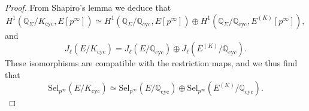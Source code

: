 \documentclass[10pt,a4paper]{amsart}
\newcommand{\Q}{\mathbb{Q}}
\newcommand{\op}[1]{\operatorname{#1}}
\begin{document}
\begin{proof}
    From Shapiro's lemma we deduce that 
    \[H^1(\Q_\Sigma/K_{\op{cyc}}, E[p^\infty])\simeq H^1(\Q_\Sigma/\Q_{\op{cyc}}, E[p^\infty])\oplus H^1(\Q_\Sigma/\Q_{\op{cyc}}, E^{(K)}[p^\infty]),\] and 
    \[J_\ell(E/K_{\op{cyc}})=J_\ell(E/\Q_{\op{cyc}})\oplus J_\ell(E^{(K)}/\Q_{\op{cyc}}).\]
    These isomorphisms are compatible with the restriction maps, and we thus find that 
    \[
    \mathrm{Sel}_{p^\infty}(E/K_{\mathrm{cyc}}) \simeq \mathrm{Sel}_{p^\infty}(E/\mathbb{Q}_{\mathrm{cyc}}) \oplus \mathrm{Sel}_{p^\infty}(E^{(K)}/\mathbb{Q}_{\mathrm{cyc}}).
    \]
\end{proof}
\end{document}
